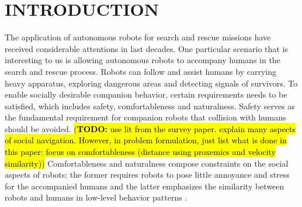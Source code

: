 \documentclass[letterpaper, 10 pt, conference]{ieeeconf}
\newcommand{\todohere}[1]{\hl{(\textbf{TODO:} #1)}}
\begin{document}
	\section{INTRODUCTION} \label{sec:intro}
	The application of autonomous robots for search and rescue missions have received considerable attentions in last decades.
	One particular scenario that is interesting to us is allowing autonomous robots to accompany humans in the search and rescue process.
	Robots can follow and assist humans by carrying heavy apparatus, exploring dangerous areas and detecting signals of survivors.
	To enable socially desirable companion behavior, certain requirements needs to be satisfied, which includes safety, comfortableness and naturalness. 
	Safety serves as the fundamental requirement for companion robots that collision with humans should be avoided. 
	\todohere{use lit from the survey paper. explain many aspects of social navigation. However, in problem formulation, just list what is done in this paper: focus on comfortableness (distance using proxemics and velocity similarity)}
	Comfortableness and naturalness compose constraints on the social aspects of robots;
	the former requires robots to pose little annoyance and stress for the accompanied humans and the latter emphasizes the similarity between robots and humans in low-level behavior patterns \cite{kruse2013human}.
	
\end{document}
